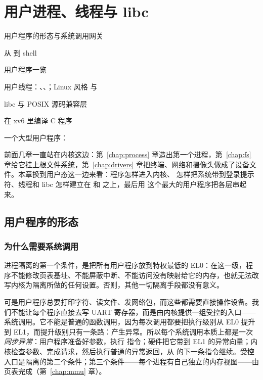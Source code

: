 \chapter{用户进程、线程与 libc}
\label{chap:user}

\begin{introduction}[本章内容]
  \item 用户程序的形态与系统调用网关
  \item 从  到 shell
  \item 用户程序一览
  \item 用户线程：、、；Linux 风格  与 
  \item libc 与 POSIX 源码兼容层
  \item 在 xv6 里编译 C 程序
  \item 一个大型用户程序：
\end{introduction}

前面几章一直站在内核这边：第~\ref{chap:process} 章造出第一个进程，第~\ref{chap:fs} 章给它挂上根文件系统，第~\ref{chap:drivers} 章把终端、网络和摄像头做成了设备文件。本章换到用户态这一边来看：程序怎样进入内核、 怎样把系统带到登录提示符、线程和 libc 怎样建立在  和  之上，最后用  这个最大的用户程序把各层串起来。

\section{用户程序的形态}

\subsection{为什么需要系统调用}

进程隔离的第一个条件，是把所有用户程序放到特权最低的 EL0：在这一级，程序不能修改页表基址、不能屏蔽中断、不能访问没有映射给它的内存，也就无法改写内核为隔离所做的任何设置。否则，其他一切隔离手段都没有意义。

可是用户程序总要打印字符、读文件、发网络包，而这些都需要直接操作设备。我们不能让每个程序直接去写 UART 寄存器，而是由内核提供一组受控的入口——系统调用。它不能是普通的函数调用，因为每次调用都要把执行级别从 EL0 提升到 EL1，而提升级别只有一条路：产生异常。所以每个系统调用本质上都是一次\emph{同步异常}：用户程序准备好参数，执行  指令；硬件把它带到 EL1 的异常向量；内核检查参数、完成请求，然后执行普通的异常返回，从  的下一条指令继续。受控入口是隔离的第二个条件；第三个条件——每个进程有自己独立的内存视图——由页表完成（第~\ref{chap:mmu} 章）。


